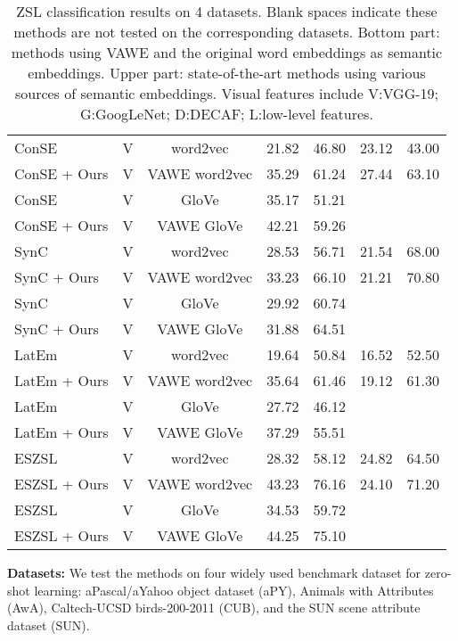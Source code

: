 \documentclass{bmvc2k}
\begin{document}
\begin{table*}[!t]
\begin{center}
\begin{tabular}{|l|c|c|c|c|c|c|}
ConSE \cite{NorouziConse13} &V & word2vec  &21.82 & 46.80   & 23.12 & 43.00 \\
ConSE \cite{NorouziConse13} + Ours &V & VAWE word2vec &35.29 & 61.24 &27.44 & 63.10 \\
ConSE \cite{NorouziConse13} &V & GloVe  &35.17 & 51.21   &  & \\
ConSE \cite{NorouziConse13} + Ours &V & VAWE GloVe &42.21 & 59.26 & &  \\
SynC \cite{SynC2016} &V & word2vec   &28.53 &56.71  & 21.54 & 68.00  \\
SynC \cite{SynC2016} + Ours &V & VAWE word2vec  &33.23 & 66.10   & 21.21 & 70.80 \\
SynC \cite{SynC2016} &V& GloVe   &29.92 &60.74  & &   \\
SynC \cite{SynC2016} + Ours &V & VAWE GloVe   &31.88 & 64.51   &  &  \\
LatEm \cite{LatEm2016} &V & word2vec &19.64  & 50.84   & 16.52 & 52.50 \\
LatEm \cite{LatEm2016} + Ours &V & VAWE word2vec &35.64 & 61.46   & 19.12 & 61.30 \\
LatEm \cite{LatEm2016} &V & GloVe &27.72  & 46.12   &  &  \\
LatEm \cite{LatEm2016} + Ours &V & VAWE GloVe &37.29 & 55.51   &  &  \\
ESZSL \cite{Romera2015ZSL} &V & word2vec & 28.32  & 58.12   & 24.82 & 64.50 \\
ESZSL \cite{Romera2015ZSL} + Ours &V &  VAWE word2vec & 43.23  & 76.16 &24.10 & 71.20 \\
ESZSL \cite{Romera2015ZSL} &V & GloVe & 34.53  & 59.72   &  &  \\
ESZSL \cite{Romera2015ZSL} + Ours &V & VAWE GloVe & 44.25  & 75.10 & &  \\
\hline
\end{tabular}
\end{center}
\caption{ZSL classification results on 4 datasets. Blank spaces indicate these methods are not tested on the corresponding datasets. Bottom part: methods using  VAWE and the original word embeddings as semantic embeddings. Upper part: state-of-the-art methods using various sources of semantic embeddings. Visual features include V:VGG-19; G:GoogLeNet; D:DECAF; L:low-level features.}
\label{tab: zsl-all}
\end{table*}

%
%
{\bf Datasets:} We test the methods on four widely used benchmark dataset for zero-shot learning: aPascal/aYahoo object dataset \cite{Farhadi09describingobjects} (aPY), Animals with Attributes \cite{Lampert09unseen} (AwA), Caltech-UCSD birds-200-2011 \cite{CUB_200_2011} (CUB), and the SUN scene attribute dataset \cite{SUNDBijcv} (SUN). %
\end{document}
